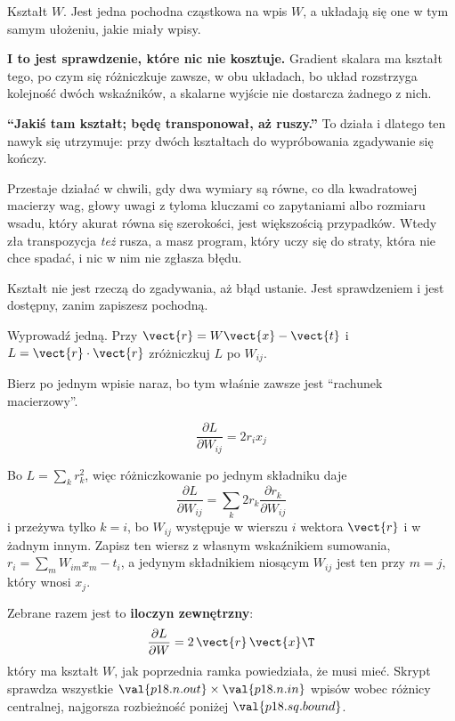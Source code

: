 \begin{fr}
\begin{ansblock}
Kształt $W$. Jest jedna pochodna cząstkowa na wpis $W$, a układają się one w
tym samym ułożeniu, jakie miały wpisy.
\end{ansblock}

\textbf{I to jest sprawdzenie, które nic nie kosztuje.} Gradient skalara ma
kształt tego, po czym się różniczkuje \dash{} zawsze, w obu układach, bo
układ rozstrzyga kolejność dwóch wskaźników, a skalarne wyjście nie dostarcza
żadnego z nich.

\end{fr}

\begin{fr}
\begin{trapbox}
\textbf{\enquote{Jakiś tam kształt; będę transponował, aż ruszy.}} To działa
i dlatego ten nawyk się utrzymuje: przy dwóch kształtach do wypróbowania
zgadywanie się kończy.

Przestaje działać w chwili, gdy dwa wymiary są równe, co dla kwadratowej
macierzy wag, głowy uwagi z tyloma kluczami co zapytaniami albo rozmiaru
wsadu, który akurat równa się szerokości, jest większością przypadków. Wtedy
zła transpozycja \emph{też} rusza, a masz program, który uczy się do straty,
która nie chce spadać, i nic w nim nie zgłasza błędu.

Kształt nie jest rzeczą do zgadywania, aż błąd ustanie. Jest sprawdzeniem i
jest dostępny, zanim zapiszesz pochodną.
\end{trapbox}
\end{fr}

\begin{fr}
Wyprowadź jedną. Przy $\vect{r} = W\vect{x} - \vect{t}$ i
$L = \vect{r} \cdot \vect{r}$ zróżniczkuj $L$ po $W_{ij}$.

Bierz po jednym wpisie naraz, bo tym właśnie zawsze jest \enquote{rachunek
macierzowy}.
\dotline
\nextframe
\end{fr}

\begin{fr}
\begin{ansblock}
\[ \frac{\partial L}{\partial W_{ij}} = 2 r_i x_j \]
\end{ansblock}

Bo $L = \sum_k r_k^{2}$, więc różniczkowanie po jednym składniku daje
\[ \frac{\partial L}{\partial W_{ij}} = \sum_k 2 r_k
   \frac{\partial r_k}{\partial W_{ij}} \]
i przeżywa tylko $k = i$, bo $W_{ij}$ występuje w wierszu $i$ wektora
$\vect{r}$ i w żadnym innym. Zapisz ten wiersz z własnym wskaźnikiem
sumowania, $r_i = \sum_m W_{im}x_m - t_i$, a jedynym składnikiem niosącym
$W_{ij}$ jest ten przy $m = j$, który wnosi $x_j$.

Zebrane razem jest to \textbf{iloczyn zewnętrzny}:
\[ \frac{\partial L}{\partial W} = 2\,\vect{r}\,\vect{x}\T \]
który ma kształt $W$, jak poprzednia ramka powiedziała, że musi mieć. Skrypt
sprawdza wszystkie $\val{p18.n.out}\times\val{p18.n.in}$ wpisów wobec różnicy
centralnej, najgorsza rozbieżność poniżej $\val{p18.sq.bound}$.
\end{fr}

